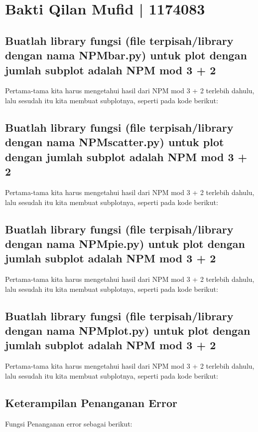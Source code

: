 \section{Bakti Qilan Mufid | 1174083}
\subsection{Buatlah library fungsi (file terpisah/library dengan nama NPM\textunderscore bar.py) untuk plot dengan jumlah subplot adalah NPM mod 3 + 2}
\hfill \break
Pertama-tama kita harus mengetahui hasil dari NPM mod 3 + 2 terlebih dahulu, lalu sesudah itu kita membuat subplotnya, seperti pada kode berikut:


\subsection{Buatlah library fungsi (file terpisah/library dengan nama NPM\textunderscore scatter.py) untuk plot dengan jumlah subplot adalah NPM mod 3 + 2}
\hfill \break
Pertama-tama kita harus mengetahui hasil dari NPM mod 3 + 2 terlebih dahulu, lalu sesudah itu kita membuat subplotnya, seperti pada kode berikut:


\subsection{Buatlah library fungsi (file terpisah/library dengan nama NPM\textunderscore pie.py) untuk plot dengan jumlah subplot adalah NPM mod 3 + 2}
\hfill \break
Pertama-tama kita harus mengetahui hasil dari NPM mod 3 + 2 terlebih dahulu, lalu sesudah itu kita membuat subplotnya, seperti pada kode berikut:


\subsection{Buatlah library fungsi (file terpisah/library dengan nama NPM\textunderscore plot.py) untuk plot dengan jumlah subplot adalah NPM mod 3 + 2}
\hfill \break
Pertama-tama kita harus mengetahui hasil dari NPM mod 3 + 2 terlebih dahulu, lalu sesudah itu kita membuat subplotnya, seperti pada kode berikut:


\subsection{Keterampilan Penanganan Error}
Fungsi Penanganan error sebagai berikut:


